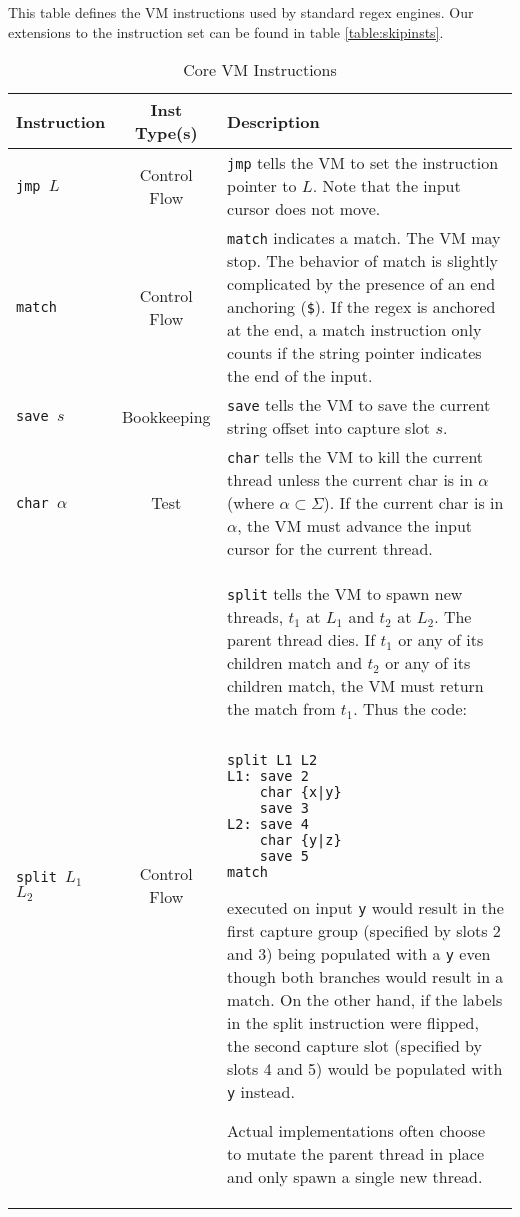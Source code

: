 \begin{table}[ht]
\centering
\caption{Core VM Instructions}
\label{table:insts}

This table defines the VM instructions used by standard regex engines.
Our extensions to the instruction set can be found in table
\ref{table:skipinsts}.
\begin{tabular}{| l | c | p{9cm} |} \hline
Instruction & Inst Type(s) & Description \\ \hline
{\tt jmp $L$} & Control Flow &
    \verb'jmp' tells the VM to set the instruction pointer
    to $L$. Note that the input cursor does not move. \\ \hline
{\tt match} & Control Flow &
    \verb'match' indicates a match. The VM may stop. The behavior of match
    is slightly complicated by the presence of an end anchoring
    (\verb'$'). If the regex is anchored at the end, a match instruction
    only counts if the string pointer indicates the end of the input.
    \\ \hline
{\tt save $s$} & Bookkeeping &
    \verb'save' tells the VM to save the current string
    offset into capture slot $s$. \\ \hline
{\tt char $\alpha$} & Test &
    \verb'char' tells the VM to kill the current thread unless
    the current char is in $\alpha$ (where $\alpha \subset \Sigma$).
    If the current char is in $\alpha$, the VM must advance the input cursor
    for the current thread. \\ \hline
{\tt split $L_1$ $L_2$} & Control Flow &
    \verb'split' tells the VM to spawn new threads, $t_1$ at $L_1$ 
    and $t_2$ at $L_2$. The parent thread dies.
    If $t_1$ or any of its children match and
    $t_2$ or any of its children match, the VM must return
    the match from $t_1$. Thus the code:
        \begin{verbatim}

split L1 L2
L1: save 2
    char {x|y}
    save 3
L2: save 4
    char {y|z}
    save 5
match
        \end{verbatim}
    executed on input \verb'y' would result in the first capture group
    (specified by slots 2 and 3) being populated with a \verb'y'
    even though both branches would result in a match. On the
    other hand, if the labels in the split instruction were
    flipped, the second capture slot (specified by slots 4 and 5)
    would be populated with \verb'y' instead.

    Actual implementations often choose to mutate the parent thread in
    place and only spawn a single new thread.
    \\ \hline
\end{tabular}
\end{table}

